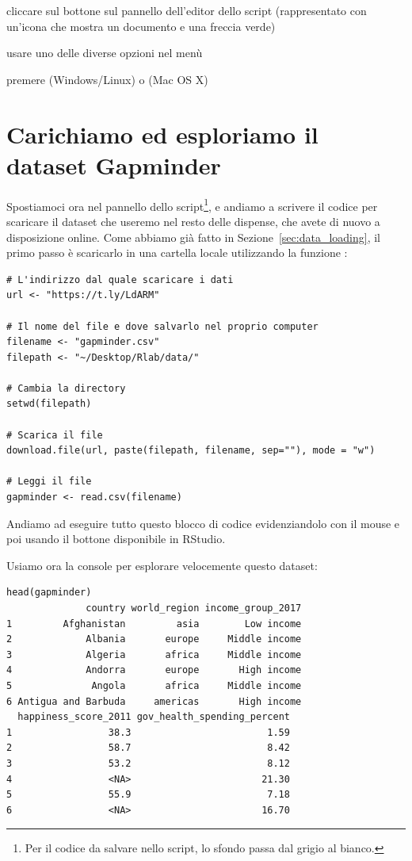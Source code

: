 \begin{myitemize}
	\item cliccare sul bottone  sul pannello dell'editor dello script (rappresentato con un'icona che mostra un documento e una freccia verde)
	\item usare uno delle diverse opzioni  nel men\`u 
	\item premere  (Windows/Linux) o  (Mac OS X)
\end{myitemize}

\section{Carichiamo ed esploriamo il dataset Gapminder}


Spostiamoci ora nel pannello dello script\footnote{Per il codice da salvare nello script, lo sfondo passa dal grigio al bianco.}, e andiamo a scrivere il codice per scaricare il dataset che useremo nel resto delle dispense, che avete di nuovo a disposizione online. Come abbiamo gi\`a fatto in Sezione~\ref{sec:data_loading}, il primo passo \`e scaricarlo in una cartella locale utilizzando la funzione :

\begin{lstlisting}[style=Rstylescript]
# L'indirizzo dal quale scaricare i dati
url <- "https://t.ly/LdARM"

# Il nome del file e dove salvarlo nel proprio computer
filename <- "gapminder.csv"
filepath <- "~/Desktop/Rlab/data/"

# Cambia la directory
setwd(filepath)

# Scarica il file
download.file(url, paste(filepath, filename, sep=""), mode = "w")

# Leggi il file
gapminder <- read.csv(filename)
\end{lstlisting}
%
Andiamo ad eseguire tutto questo blocco di codice evidenziandolo con il mouse e poi usando il bottone  disponibile in RStudio.

\noindent Usiamo ora la console per esplorare velocemente questo dataset:


\begin{lstlisting}[style=Rstyle]
head(gapminder)
              country world_region income_group_2017
1         Afghanistan         asia        Low income
2             Albania       europe     Middle income
3             Algeria       africa     Middle income
4             Andorra       europe       High income
5              Angola       africa     Middle income
6 Antigua and Barbuda     americas       High income
  happiness_score_2011 gov_health_spending_percent
1                 38.3                        1.59
2                 58.7                        8.42
3                 53.2                        8.12
4                 <NA>                       21.30
5                 55.9                        7.18
6                 <NA>                       16.70
\end{lstlisting}


